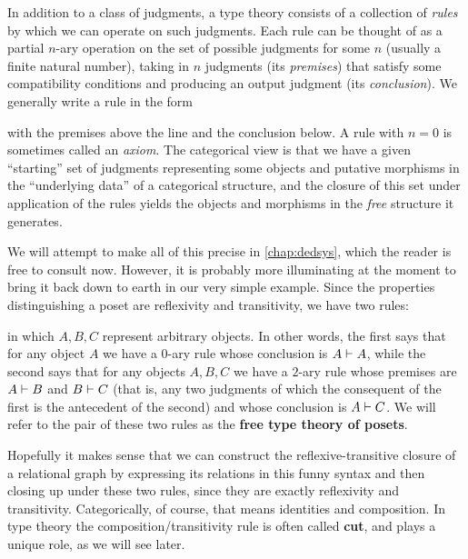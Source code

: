 In addition to a class of judgments, a type theory consists of a collection of \emph{rules} by which we can operate on such judgments.
Each rule can be thought of as a partial $n$-ary operation on the set of possible judgments for some $n$ (usually a finite natural number), taking in $n$ judgments (its \emph{premises}) that satisfy some compatibility conditions and producing an output judgment (its \emph{conclusion}).
We generally write a rule in the form
\begin{mathpar}
\end{mathpar}
with the premises above the line and the conclusion below.
A rule with $n=0$ is sometimes called an \emph{axiom}.
The categorical view is that we have a given ``starting'' set of judgments representing some objects and putative morphisms in the ``underlying data'' of a categorical structure, and the closure of this set under application of the rules yields the objects and morphisms in the \emph{free} structure it generates.

We will attempt to make all of this precise in \cref{chap:dedsys}, which the reader is free to consult now.
However, it is probably more illuminating at the moment to bring it back down to earth in our very simple example.
Since the properties distinguishing a poset are reflexivity and transitivity, we have two rules:
in which $A,B,C$ represent arbitrary objects.
In other words, the first says that for any object $A$ we have a $0$-ary rule whose conclusion is $A\types A$, while the second says that for any objects $A,B,C$ we have a $2$-ary rule whose premises are $A\types B$ and $B\types C$ (that is, any two judgments of which the consequent of the first is the antecedent of the second) and whose conclusion is $A\types C$.
We will refer to the pair of these two rules as the \textbf{free type theory of posets}.

Hopefully it makes sense that we can construct the reflexive-transitive closure of a relational graph by expressing its relations in this funny syntax and then closing up under these two rules, since they are exactly reflexivity and transitivity.
Categorically, of course, that means identities and composition.
In type theory the composition/transitivity rule is often called \textbf{cut}, and plays a unique role, as we will see later.

